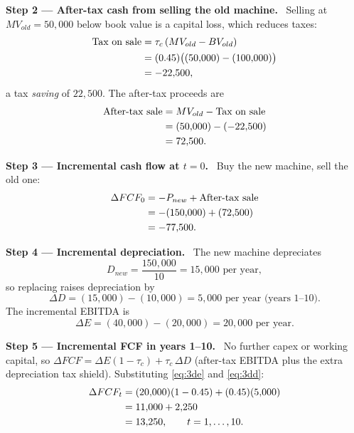 \documentclass[11pt,a4paper]{article}
\numberwithin{equation}{section}
\newcommand{\step}[2]{\par\medskip\noindent\textbf{Step #1 --- #2.}~}
\begin{document}
\step{2}{After-tax cash from selling the old machine} Selling at $MV_{old}=50{,}000$ below book
value is a capital loss, which reduces taxes:
\begin{align}
  \text{Tax on sale} &= \tau_c\,(MV_{old}-BV_{old}) \notag\\
                     &= (0.45)\bigl((50{,}000)-(100{,}000)\bigr) \notag\\
                     &= -22{,}500 , \label{eq:3tax}
\end{align}
a tax \emph{saving} of $22{,}500$. The after-tax proceeds are
\begin{align}
  \text{After-tax sale} &= MV_{old} - \text{Tax on sale} \notag\\
                        &= (50{,}000) - (-22{,}500) \notag\\
                        &= 72{,}500 . \label{eq:3sale}
\end{align}

\step{3}{Incremental cash flow at $t=0$} Buy the new machine, sell the old one:
\begin{align}
  \Delta FCF_0 &= -P_{new} + \text{After-tax sale} \notag\\
               &= -(150{,}000) + (72{,}500) \notag\\
               &= -77{,}500 . \label{eq:3fcf0}
\end{align}

\step{4}{Incremental depreciation} The new machine depreciates
\begin{equation}\label{eq:3dnew}
  D_{new} = \frac{150{,}000}{10} = 15{,}000 \text{ per year},
\end{equation}
so replacing raises depreciation by
\begin{equation}\label{eq:3dd}
  \Delta D = (15{,}000) - (10{,}000) = 5{,}000 \text{ per year (years 1--10)}.
\end{equation}
The incremental EBITDA is
\begin{equation}\label{eq:3de}
  \Delta E = (40{,}000) - (20{,}000) = 20{,}000 \text{ per year}.
\end{equation}

\step{5}{Incremental FCF in years 1--10} No further capex or working capital, so
$\Delta FCF = \Delta E(1-\tau_c) + \tau_c\,\Delta D$ (after-tax EBITDA plus the extra depreciation
tax shield). Substituting \eqref{eq:3de} and \eqref{eq:3dd}:
\begin{align}
  \Delta FCF_t &= (20{,}000)(1-0.45) + (0.45)(5{,}000) \notag\\
               &= 11{,}000 + 2{,}250 \notag\\
               &= 13{,}250, \qquad t = 1,\dots,10 . \label{eq:3fcf}
\end{align}
\end{document}
